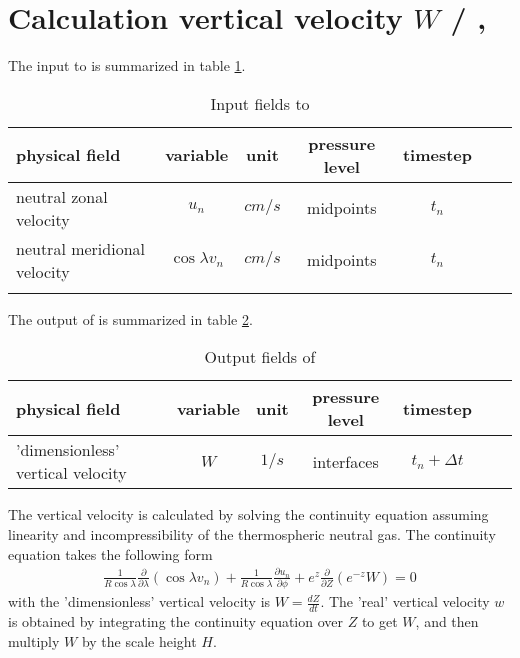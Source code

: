 %
\section{Calculation vertical velocity $W$ / ,  }\label{cap:divrg}
%
The input to  is summarized in table
\ref{tab:input_swdot}.
%
\begin{table}[tb]
\begin{tabular}{|p{3.5cm} ||c|c|c|c|c|c|} \hline
physical field               & variable        & unit&pressure
level& timestep
\\ \hline \hline
%
neutral zonal velocity &       $u_n$              & $cm/s$   &  midpoints & $t_n$\\
neutral meridional velocity &       $\cos \lambda v_n$              & $cm/s$   &  midpoints & $t_n$\\
 \\ \hline
\end{tabular}
\caption{Input fields to }
\label{tab:input_swdot}
\end{table}
%
The output of  is summarized in table
\ref{tab:output_swdot}.
%
\begin{table}[tb]
\begin{tabular}{|p{3.5cm} ||c|c|c|c|c|c|} \hline
physical field               & variable        & unit&pressure
level& timestep \\ \hline \hline 'dimensionless' vertical velocity &
$W$ & $1/s$ & interfaces  & $t_n+\Delta t$
\\ \hline \hline
\end{tabular}
\caption{Output fields of }
\label{tab:output_swdot}
\end{table}
%
The vertical velocity is calculated by solving the continuity
equation assuming linearity and incompressibility of the
thermospheric neutral gas. The continuity equation takes the
following form
%
\begin{align}
  \frac{1}{R \cos \lambda} \frac{\partial}{\partial \lambda} (\cos \lambda
  v_n) + \frac{1}{R \cos \lambda } \frac{\partial u_n}{\partial
  \phi} + e^z \frac{\partial}{\partial Z}(e^{-z}W) = 0
\end{align}
%
with the 'dimensionless' vertical velocity is $W= \frac{dZ}{dt}$.
The 'real' vertical velocity $w$ is obtained by integrating the
continuity equation over $Z$ to get $W$, and then multiply $W$ by
the scale height $H$. \\

